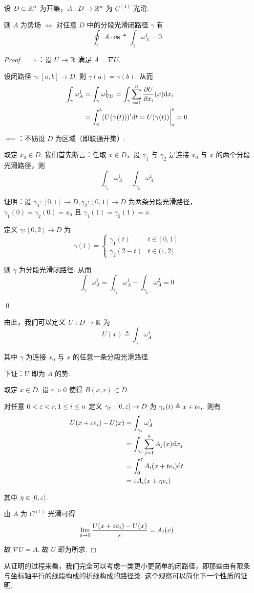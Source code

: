 \begin{property}
    设 $D\subset\mathbb{R}^n$ 为开集，$A:D\to\mathbb{R}^n$ 为 $C^{(1)}$ 光滑.

    则 $A$ 为势场 $\iff$ 对任意 $D$ 中的分段光滑闭路径 $\gamma$ 有
$$
\oint_\gamma A\cdot\dd\mathbf{s}\triangleq\int_\gamma\omega_A^1=0
$$
\end{property}
\begin{proof}
    $\implies$：设 $U\to\mathbb{R}$ 满足 $A=\nabla U$.
    
    设闭路径 $\gamma:[a,b]\to D$. 则 $\gamma(a)=\gamma(b)$. 从而
$$
\begin{aligned}
    \int_\gamma\omega_A^1&=\int_\gamma\omega_{\nabla U}^1=\int_\gamma\sum_{i=1}^n\frac{\partial{U}}{\partial{x_i}}(x)\mathrm{d} x_i\\
    &=\int_a^b(U(\gamma(t)))'\mathrm{d} t=U(\gamma(t))\biggr |_a^b=0
\end{aligned}
$$

    $\impliedby$：不妨设 $D$ 为区域（即联通开集）.

    取定 $x_0\in D$. 我们首先断言：任取 $x\in D$，设 $\gamma_1$ 与 $\gamma_2$ 是连接 $x_0$ 与 $x$ 的两个分段光滑路径，则
$$
\int_{\gamma_1}\omega_A^1=\int_{\gamma_2}\omega_A^1
$$

    证明：设 $\gamma_1:[0,1]\to D,\gamma_2:[0,1]\to D$ 为两条分段光滑路径，$\gamma_1(0)=\gamma_2(0)=x_0$ 且 $\gamma_1(1)=\gamma_2(1)=x$.

    定义 $\gamma:[0,2]\to D$ 为
$$
\gamma(t)=\begin{cases}
    \gamma_1(t) & t\in[0,1]\\
    \gamma_2(2-t) & t\in(1,2]
\end{cases}
$$


    则 $\gamma$ 为分段光滑闭路径. 从而
$$
\int_\gamma\omega_A^1=\int_{\gamma_1}\omega_A^1-\int_{\gamma_2}\omega_A^2=0
$$

    \qed

    由此，我们可以定义 $U:D\to\mathbb{R}$ 为
$$
U(x)\triangleq\int_\gamma\omega_A^1
$$

    其中 $\gamma$ 为连接 $x_0$ 与 $x$ 的任意一条分段光滑路径.

    下证：$U$ 即为 $A$ 的势.

    取定 $x\in D$. 设 $r>0$ 使得 $B(x,r)\subset D$.

    对任意 $0<\varepsilon<r,1\le i\le n$ 定义 $\gamma_\varepsilon:[0,\varepsilon]\to D$ 为 $\gamma_\varepsilon(t)\triangleq x+te_i$. 则有
$$
\begin{aligned}
    U(x+\varepsilon e_i)-U(x)&=\int_{\gamma_\varepsilon}\omega_A^1\\
    &=\int_{\gamma_\varepsilon}\sum_{j=1}^nA_j(x)\mathrm{d} x_j\\
    &=\int_0^\varepsilon A_i(x+te_i)\mathrm{d} t\\
    &=\varepsilon A_i(x+\eta e_i)
\end{aligned}
$$

    其中 $\eta\in[0,\varepsilon]$.


    由 $A$ 为 $C^{(1)}$ 光滑可得
$$
\lim_{\varepsilon\to 0}\frac{U(x+\varepsilon e_i)-U(x)}{\varepsilon}=A_i(x)
$$

    故 $\nabla U=A$. 故 $U$ 即为所求.
\end{proof}

\begin{hint}
    从证明的过程来看，我们完全可以考虑一类更小更简单的闭路径，即那些由有限条与坐标轴平行的线段构成的折线构成的路径类. 这个观察可以简化下一个性质的证明.
\end{hint}
